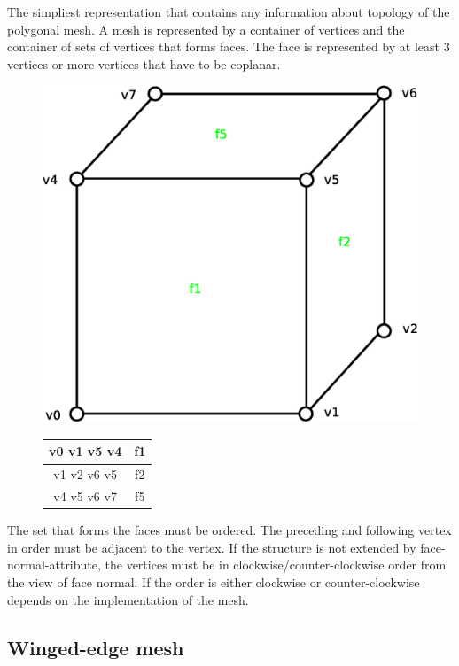 The simpliest representation that contains any information about topology of the polygonal
mesh. A mesh is represented by a container of vertices and the container of sets of vertices that
forms faces. The face is represented by at least 3 vertices or more vertices that have to be
coplanar.\\

\begin{figure}[h]

\begin{minipage}[hb]{0.65\linewidth}
\centering
\includegraphics[width=0.6\linewidth]{../img/fv_rep_mesh.eps}
\label{fig:figure1}
\end{minipage}
\hspace{0.5cm}
\begin{minipage}[hb]{0.25\linewidth}
\centering
\begin{tabular}{|c|c|}
\hline
\textsf{v0 v1 v5 v4} & \textsf{f1}\\
\hline
\textsf{v1 v2 v6 v5} & \textsf{f2}\\
\hline
\textsf{v4 v5 v6 v7} & \textsf{f5}\\
\hline
\end{tabular}
\label{fig:figure2}
\end{minipage}

\end{figure}

The set that forms the faces must be ordered. The preceding and following vertex in order must be 
adjacent to
the vertex. If the structure is not extended by face-normal-attribute, the vertices must be in 
clockwise/counter-clockwise order from the view of face normal. If the order is either clockwise or counter-clockwise
depends on the implementation of the mesh.

\subsection{Winged-edge mesh}

